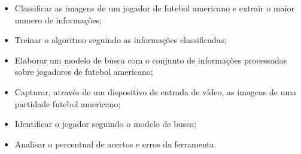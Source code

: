 \begin{block}{}
\begin{itemize}
\item Classificar as imagens de um jogador de futebol americano e extrair o maior numero de informações;

\item Treinar o algoritmo seguindo as informações classificadas;

\item Elaborar um modelo de busca com o conjunto de informações processadas sobre jogadores de futebol americano;
   
\item Capturar, através de um dispositivo de entrada de vídeo, as imagens de uma partidade futebol americano;
   
\item Identificar o jogador seguindo o modelo de busca;
   
\item Analisar o percentual de acertos e erros da ferramenta.

\end{itemize}
\end{block}
